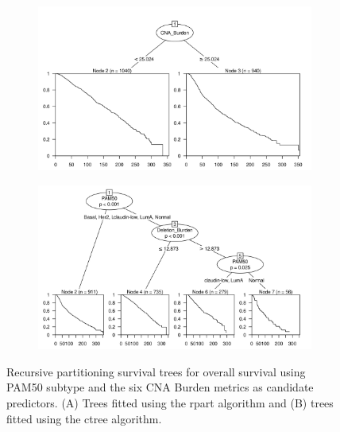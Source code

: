 \begin{figure}[!htb]
\centering

\vspace{0.5cm}

\begin{subfigure}{\textwidth}
\subcaption{}
\includegraphics[width=1\textwidth]{../figures/Appendices/Appendix_B/PartyKit_Survival_Burden_OS_PAM50.png}
\end{subfigure}

\vspace{2cm}

\begin{subfigure}{\textwidth}
\subcaption{}
\includegraphics[width=1\textwidth]{../figures/Appendices/Appendix_B/Ctree_Survival_Burden_OS_PAM50.png}
\end{subfigure}

\vspace{0.5cm}

\caption[Recursive partitioning survival trees for overall survival using PAM50 subtype and the six CNA Burden metrics as candidate predictors.]{Recursive partitioning survival trees for overall survival using PAM50 subtype and the six CNA Burden metrics as candidate predictors. (A) Trees fitted using the rpart algorithm and (B) trees fitted using the ctree algorithm.}
\end{figure}

